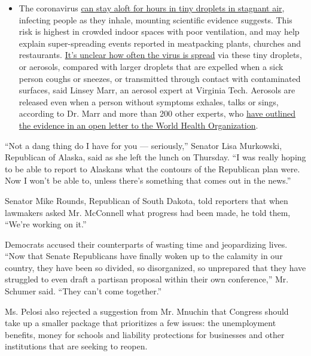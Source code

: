 \begin{itemize}
  \begin{itemize}
  \tightlist
  \item
    The coronavirus
    \href{https://www.nytimes.com/2020/07/04/health/239-experts-with-one-big-claim-the-coronavirus-is-airborne.html?action=click\&pgtype=Article\&state=default\&region=MAIN_CONTENT_3\&context=storylines_faq}{can
    stay aloft for hours in tiny droplets in stagnant air}, infecting
    people as they inhale, mounting scientific evidence suggests. This
    risk is highest in crowded indoor spaces with poor ventilation, and
    may help explain super-spreading events reported in meatpacking
    plants, churches and restaurants.
    \href{https://www.nytimes.com/2020/07/06/health/coronavirus-airborne-aerosols.html?action=click\&pgtype=Article\&state=default\&region=MAIN_CONTENT_3\&context=storylines_faq}{It's
    unclear how often the virus is spread} via these tiny droplets, or
    aerosols, compared with larger droplets that are expelled when a
    sick person coughs or sneezes, or transmitted through contact with
    contaminated surfaces, said Linsey Marr, an aerosol expert at
    Virginia Tech. Aerosols are released even when a person without
    symptoms exhales, talks or sings, according to Dr. Marr and more
    than 200 other experts, who
    \href{https://academic.oup.com/cid/article/doi/10.1093/cid/ciaa939/5867798}{have
    outlined the evidence in an open letter to the World Health
    Organization}.
  \end{itemize}
\end{itemize}

``Not a dang thing do I have for you --- seriously,'' Senator Lisa
Murkowski, Republican of Alaska, said as she left the lunch on Thursday.
``I was really hoping to be able to report to Alaskans what the contours
of the Republican plan were. Now I won't be able to, unless there's
something that comes out in the news.''

Senator Mike Rounds, Republican of South Dakota, told reporters that
when lawmakers asked Mr. McConnell what progress had been made, he told
them, ``We're working on it.''

Democrats accused their counterparts of wasting time and jeopardizing
lives. ``Now that Senate Republicans have finally woken up to the
calamity in our country, they have been so divided, so disorganized, so
unprepared that they have struggled to even draft a partisan proposal
within their own conference,'' Mr. Schumer said. ``They can't come
together.''

Ms. Pelosi also rejected a suggestion from Mr. Mnuchin that Congress
should take up a smaller package that prioritizes a few issues: the
unemployment benefits, money for schools and liability protections for
businesses and other institutions that are seeking to reopen.

